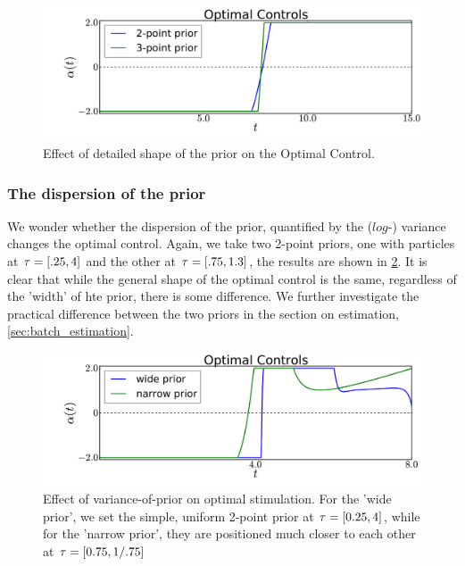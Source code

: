 \begin{figure}[htp]
\begin{center}
  \includegraphics[width=1\textwidth]{Figs/AdjointOptimizer/NumberOfTausEffect.pdf}
  \caption[Detailed-Shape-of-Prior Impact]{Effect of detailed shape of the prior
  on the Optimal Control.} 
  \label{fig:prior_shape_impact} 
\end{center}
\end{figure}

\subsubsection{The dispersion of the prior}
We wonder whether the dispersion of the prior, quantified by the ($log$-)
variance changes the optimal control. Again, we take two 2-point priors, one with
particles at ${ \tau } = [.25, 4]$ and the other at ${ \tau } = [.75,1.3]$, the results
are shown in \cref{fig:prior_dispersion_impact}. It is clear that while the
general shape of the optimal control is the same, regardless of the 'width' of
hte prior, there is some difference. We further investigate the
practical difference between the two priors in the section on estimation,
\cref{sec:batch_estimation}.

\begin{figure}[htp]
\begin{center}
  \includegraphics[width=\textwidth]{Figs/AdjointOptimizer/PriorSpread.pdf}
  \caption[Variance-of-Prior Effect]{Effect of variance-of-prior on
  optimal stimulation. For the 'wide prior', we set the simple, uniform 2-point prior at
   ${ \tau } =  [0.25, 4]$, while for the 'narrow prior', they are positioned much
   closer to each other at ${ \tau } =   [0.75, 1/.75 ]$  }
  \label{fig:prior_dispersion_impact} 
\end{center}
\end{figure}

